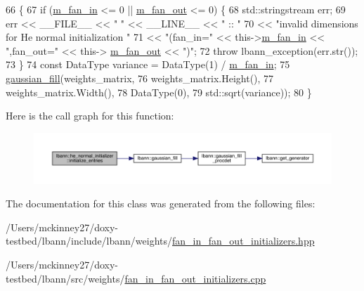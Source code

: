 \begin{DoxyCode}
66                                                                                \{
67   \textcolor{keywordflow}{if} (\hyperlink{classlbann_1_1fan__in__fan__out__initializer_aea6639db271d9050f0a2e4f8c8dfa6cd}{m\_fan\_in} <= 0 || \hyperlink{classlbann_1_1fan__in__fan__out__initializer_ac67d275ab8574780525d2af59b738338}{m\_fan\_out} <= 0) \{
68     std::stringstream err;
69     err << \_\_FILE\_\_ << \textcolor{stringliteral}{" "} << \_\_LINE\_\_ << \textcolor{stringliteral}{" :: "}
70         << \textcolor{stringliteral}{"invalid dimensions for He normal initialization "}
71         << \textcolor{stringliteral}{"(fan\_in="} << this->\hyperlink{classlbann_1_1fan__in__fan__out__initializer_aea6639db271d9050f0a2e4f8c8dfa6cd}{m\_fan\_in} << \textcolor{stringliteral}{",fan\_out="} << this->
      \hyperlink{classlbann_1_1fan__in__fan__out__initializer_ac67d275ab8574780525d2af59b738338}{m\_fan\_out} << \textcolor{stringliteral}{")"};
72     \textcolor{keywordflow}{throw} lbann\_exception(err.str());
73   \}
74   \textcolor{keyword}{const} DataType variance = DataType(1) / \hyperlink{classlbann_1_1fan__in__fan__out__initializer_aea6639db271d9050f0a2e4f8c8dfa6cd}{m\_fan\_in};
75   \hyperlink{namespacelbann_abd116f95f55d0e29d9a0cc386139c4b4}{gaussian\_fill}(weights\_matrix,
76                 weights\_matrix.Height(),
77                 weights\_matrix.Width(),
78                 DataType(0),
79                 std::sqrt(variance));
80 \}
\end{DoxyCode}
Here is the call graph for this function\+:\nopagebreak
\begin{figure}[H]
\begin{center}
\leavevmode
\includegraphics[width=350pt]{classlbann_1_1he__normal__initializer_a01d283880fc0c1b743bcc89e732f4e15_cgraph}
\end{center}
\end{figure}


The documentation for this class was generated from the following files\+:\begin{DoxyCompactItemize}
\item 
/\+Users/mckinney27/doxy-\/testbed/lbann/include/lbann/weights/\hyperlink{fan__in__fan__out__initializers_8hpp}{fan\+\_\+in\+\_\+fan\+\_\+out\+\_\+initializers.\+hpp}\item 
/\+Users/mckinney27/doxy-\/testbed/lbann/src/weights/\hyperlink{fan__in__fan__out__initializers_8cpp}{fan\+\_\+in\+\_\+fan\+\_\+out\+\_\+initializers.\+cpp}\end{DoxyCompactItemize}
